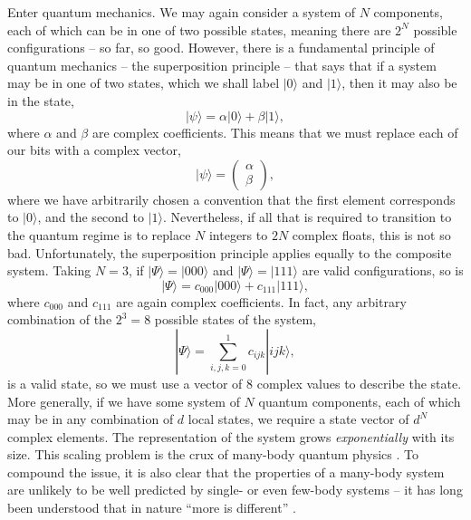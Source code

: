 Enter quantum mechanics. We may again consider a system of \(N\) components, each of which can be in one of two possible states, meaning there are \(2^{N}\) possible configurations -- so far, so good. However, there is a fundamental principle of quantum mechanics -- the superposition principle -- that says that if a system may be in one of two states, which we shall label \(|0 \rangle\) and \(|1\rangle\), then it may also be in the state,
\begin{equation}
	| \psi \rangle = \alpha |0\rangle + \beta |1\rangle,
	\label{eq:mbq1-1}
\end{equation}
where \(\alpha\) and \(\beta\) are complex coefficients. This means that we must replace each of our bits with a complex vector,
\begin{equation}
	|\psi \rangle = \begin{pmatrix}
						\alpha \\
						\beta
					\end{pmatrix},
	\label{eq:mbq1-2}
\end{equation}
where we have arbitrarily chosen a convention that the first element corresponds to \(|0\rangle\), and the second to \(|1\rangle\). Nevertheless, if all that is required to transition to the quantum regime is to replace \(N\) integers to \(2N\) complex floats, this is not so bad. Unfortunately, the superposition principle applies equally to the composite system. Taking \(N=3\), if \(|\Psi\rangle = |000\rangle\) and \(|\Psi\rangle = |111\rangle\) are valid configurations, so is
\begin{equation}
	| \Psi \rangle = c_{000}|000 \rangle + c_{111}| 111 \rangle,
	\label{eq:mbq1-3}
\end{equation}
where \(c_{000}\) and \(c_{111}\) are again complex coefficients. In fact, any arbitrary combination of the \(2^{3} = 8\) possible states of the system,
\begin{equation}
	| \Psi \rangle = \sum^{1}_{i,j,k=0} c_{ijk} |ijk \rangle,
	\label{eq:mbq1-4}
\end{equation}
is a valid state, so we must use a vector of 8 complex values to describe the state. More generally, if we have some system of \(N\) quantum components, each of which may be in any combination of \(d\) local states, we require a state vector of \(d^{N}\) complex elements. The representation of the system grows \emph{exponentially} with its size. This scaling problem is the crux of many-body quantum physics \cite{Barnett_MS,NielsenChuang_CS}. To compound the issue, it is also clear that the properties of a many-body system are unlikely to be well predicted by single- or even few-body systems -- it has long been understood that in nature ``more is different'' \cite{Anderson1972}.

